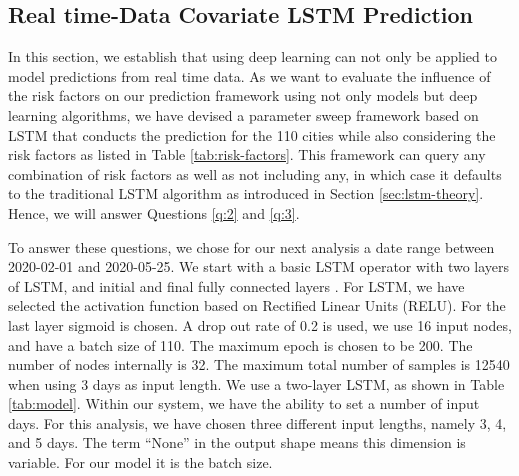 \documentclass[letterpaper, inpress]{jds} %
\renewcommand{\_}{%
    \textunderscore\hspace{0pt}%
}
\begin{document}
\subsection{Real time-Data Covariate LSTM Prediction}
\label{sec:lstm-covariate}

In this section, we establish that using deep learning can not only be
applied to model predictions from real time data. As we want to
evaluate the influence of the risk factors on our prediction framework
using not only models but deep learning algorithms, we have devised a
parameter sweep framework based on LSTM that conducts the prediction
for the 110 cities while also considering the risk factors as listed
in Table \ref{tab:risk-factors}. This framework can query any
combination of risk factors as well as not including any, in which
case it defaults to the traditional LSTM algorithm as introduced in
Section \ref{sec:lstm-theory}. Hence, we will answer Questions
\ref{q:2} and \ref{q:3}.

To answer these questions, we chose for our next analysis a date range
between 2020-02-01 and 2020-05-25. We start with a basic LSTM operator
with two layers of LSTM, and initial and final fully connected layers
\citep{Kadupitiya2020-zq}.  For LSTM, we have selected the activation
function based on Rectified Linear Units (RELU). For the last layer
sigmoid is chosen. A drop out rate of 0.2 is used, we use 16 input
nodes, and have a batch size of 110. The maximum epoch is chosen to be
200. The number of nodes internally is 32. The maximum total number of
samples is 12540 when using 3 days as input length. We use a two-layer
LSTM, as shown in Table \ref{tab:model}. Within our system, we have
the ability to set a number of input days. For this analysis, we have
chosen three different input lengths, namely 3, 4, and 5 days. The
term ``None'' in the output shape means this dimension is
variable. For our model it is the batch size.  
\end{document}
